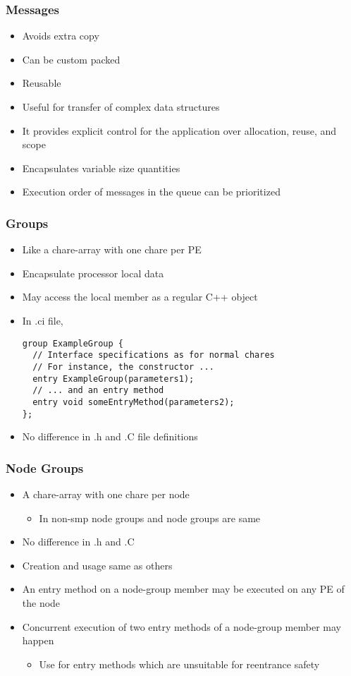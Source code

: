 \begin{frame}[fragile]
  \frametitle{Messages}
  \begin{itemize}
    \item Avoids extra copy
    \item Can be custom packed
    \item Reusable
    \item Useful for transfer of complex data structures
    \item It provides explicit control for the application over allocation, reuse, and scope
    \item Encapsulates variable size quantities
    \item Execution order of messages in the queue can be prioritized
  \end{itemize}
\end{frame}

\begin{frame}[fragile]
  \frametitle{Groups}
  \begin{itemize}
    \item Like a chare-array with one chare per PE
    \item Encapsulate processor local data
    \item May access the local member as a regular C++ object
    \item In .ci file, 
    \begin{lstlisting}
group ExampleGroup {
  // Interface specifications as for normal chares
  // For instance, the constructor ...
  entry ExampleGroup(parameters1);
  // ... and an entry method
  entry void someEntryMethod(parameters2);
};
    \end{lstlisting}
    \item No difference in .h and .C file definitions
  \end{itemize}
\end{frame}

\begin{frame}[fragile]
  \frametitle{Node Groups}
  \begin{itemize}
    \item A chare-array with one chare per node
    \begin{itemize}
      \item In non-smp node groups and node groups are same
    \end{itemize}
    \item No difference in .h and .C
    \item Creation and usage same as others
    \item An entry method on a node-group member may be executed on any PE of the node
    \item Concurrent execution of two entry methods of a node-group member may happen
    \begin{itemize}
      \item Use \code{[exclusive]} for entry methods which are unsuitable for reentrance safety
    \end{itemize}
  \end{itemize}
\end{frame}

